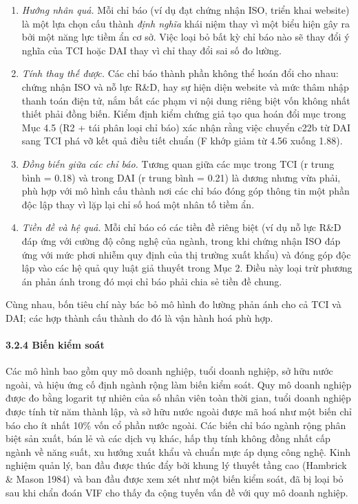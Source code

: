 \documentclass[12pt,a4paper]{article}
\providecommand{\tightlist}{\setlength{\itemsep}{0pt}\setlength{\parskip}{0pt}}
\begin{document}
\begin{enumerate}
\def\labelenumi{\arabic{enumi}.}
\tightlist
\item
  \emph{Hướng nhân quả.} Mỗi chỉ báo (ví dụ đạt chứng nhận ISO, triển
  khai website) là một lựa chọn cấu thành \emph{định nghĩa} khái niệm
  thay vì một biểu hiện gây ra bởi một năng lực tiềm ẩn cơ sở. Việc loại
  bỏ bất kỳ chỉ báo nào sẽ thay đổi ý nghĩa của TCI hoặc DAI thay vì chỉ
  thay đổi sai số đo lường.
\item
  \emph{Tính thay thế được.} Các chỉ báo thành phần không thể hoán đổi
  cho nhau: chứng nhận ISO và nỗ lực R\&D, hay sự hiện diện website và
  mức thâm nhập thanh toán điện tử, nắm bắt các phạm vi nội dung riêng
  biệt vốn không nhất thiết phải đồng biến. Kiểm định kiểm chứng giả tạo
  qua hoán đổi mục trong Mục 4.5 (R2 + tái phân loại chỉ báo) xác nhận
  rằng việc chuyển c22b từ DAI sang TCI phá vỡ kết quả điều tiết chuẩn
  (F khớp giảm từ 4.56 xuống 1.88).
\item
  \emph{Đồng biến giữa các chỉ báo.} Tương quan giữa các mục trong TCI
  (r trung bình = 0.18) và trong DAI (r trung bình = 0.21) là dương
  nhưng vừa phải, phù hợp với mô hình cấu thành nơi các chỉ báo đóng góp
  thông tin một phần độc lập thay vì lặp lại chỉ số hoá một nhân tố tiềm
  ẩn.
\item
  \emph{Tiền đề và hệ quả.} Mỗi chỉ báo có các tiền đề riêng biệt (ví dụ
  nỗ lực R\&D đáp ứng với cường độ công nghệ của ngành, trong khi chứng
  nhận ISO đáp ứng với mức phơi nhiễm quy định của thị trường xuất khẩu)
  và đóng góp độc lập vào các hệ quả quy luật giả thuyết trong Mục 2.
  Điều này loại trừ phương án phản ánh trong đó mọi chỉ báo phải chia sẻ
  tiền đề chung.
\end{enumerate}

Cùng nhau, bốn tiêu chí này bác bỏ mô hình đo lường phản ánh cho cả TCI
và DAI; các hợp thành cấu thành do đó là vận hành hoá phù hợp.

\hypertarget{324-biux1ebfn-kiux1ec3m-souxe1t}{%
\paragraph{3.2.4 Biến kiểm soát}\label{324-biux1ebfn-kiux1ec3m-souxe1t}}

Các mô hình bao gồm quy mô doanh nghiệp, tuổi doanh nghiệp, sở hữu nước
ngoài, và hiệu ứng cố định ngành rộng làm biến kiểm soát. Quy mô doanh
nghiệp được đo bằng logarit tự nhiên của số nhân viên toàn thời gian,
tuổi doanh nghiệp được tính từ năm thành lập, và sở hữu nước ngoài được
mã hoá như một biến chỉ báo cho ít nhất 10\% vốn cổ phần nước ngoài. Các
biến chỉ báo ngành rộng phân biệt sản xuất, bán lẻ và các dịch vụ khác,
hấp thụ tính không đồng nhất cấp ngành về năng suất, xu hướng xuất khẩu
và chuẩn mực áp dụng công nghệ. Kinh nghiệm quản lý, ban đầu được thúc
đẩy bởi khung lý thuyết tầng cao (Hambrick \& Mason 1984) và ban đầu
được xem xét như một biến kiểm soát, đã bị loại bỏ sau khi chẩn đoán VIF
cho thấy đa cộng tuyến vấn đề với quy mô doanh nghiệp.
\end{document}
